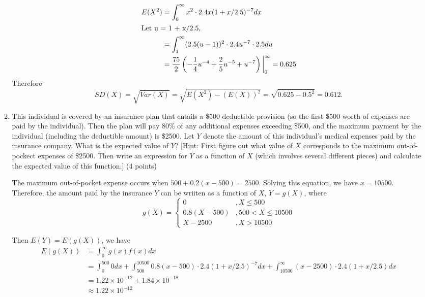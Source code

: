 \documentclass{article}\usepackage[]{graphicx}\usepackage[]{color}
\begin{document}
\begin{enumerate}
\begin{enumerate}
		\begin{align*}
		E(X^2) &= \int_{0}^\infty x^2 \cdot 2.4 x(1 + x/2.5)^{-7} dx\\
		\intertext{Let u = 1 + x/2.5,}
		& = \int_{1}^\infty (2.5(u-1))^2 \cdot 2.4 u^{-7} \cdot 2.5 du\\
		& = \frac{75}{2} \left(-\frac{1}{4} u^{-4} + \frac{2}{5} u^{-5} + u^{-7}\right)\bigg|_0^\infty = 0.625
		\end{align*}
		Therefore
		\[SD(X) = \sqrt{Var(X)} = \sqrt{E(X^2) - (E(X))^2} = \sqrt{0.625 - 0.5^2} = 0.612.\]
		
		\item 
		{\color{black} This individual is covered by an insurance plan that entails a \$500 deductible provision (so the first \$500 worth of expenses are paid by the individual). Then the plan will pay 80\% of any additional expenses exceeding \$500, and the maximum payment by the individual (including the deductible amount) is \$2500. Let $Y$ denote the amount of this individual's medical expenses paid by the insurance company. What is the expected value of $Y$? [Hint: First figure out what value of $X$ corresponds to the maximum out-of-pockect expenses of \$2500. Then write an expression for $Y$ as a function of $X$ (which involves several different pieces) and calculate the expected value of this function.] }(4 points)
		
		The maximum out-of-pocket expense occurs when $500 + 0.2 (x - 500) = 2500$. Solving this equation, we have $x = 10500$. Therefore, the amount paid by the insurance $Y$ can be wriiten as a function of $X$, $Y = g(X)$, where
		\[g(X) = \begin{cases}
		0 & , X \leq 500\\
		0.8(X - 500) & , 500 < X \leq 10500\\
		X - 2500 & , X > 10500
		\end{cases}\]
		
		Then $E(Y) = E(g(X))$, we have
		\begin{align*}
		E(g(X)) & = \int_{0}^\infty g(x) f(x) dx\\
		& = \int_{0}^{500} 0 dx + \int_{500}^{10500} 0.8(x - 500) \cdot 2.4(1 + x/2.5)^{-7} dx + \int_{10500}^\infty (x - 2500) \cdot 2.4 (1 + x/2.5)dx\\
		& = 1.22 \times 10^{-12} + 1.84 \times 10^{-18}\\
		&\approx 1.22 \times 10^{-12}
		\end{align*}
		
		
		

\end{enumerate}
\end{enumerate}
\end{document}
